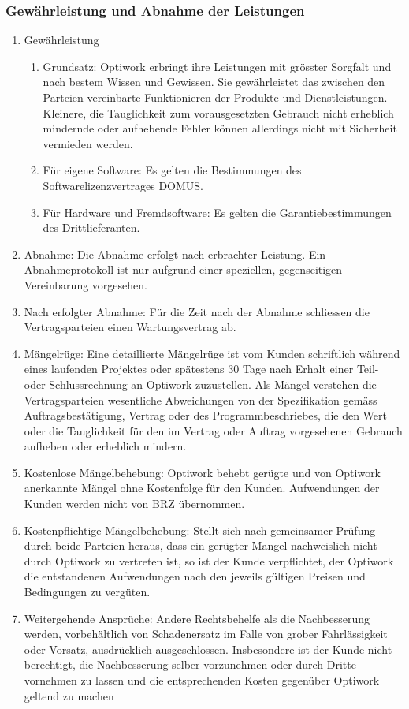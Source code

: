 \subsubsection*{Gewährleistung und Abnahme der Leistungen}
\begin{enumerate}
  \item Gewährleistung
  \begin{enumerate}
    \item Grundsatz: Optiwork erbringt ihre Leistungen mit grösster Sorgfalt und nach bestem Wissen und Gewissen. Sie gewährleistet das zwischen den Parteien vereinbarte Funktionieren der Produkte und Dienstleistungen. Kleinere, die Tauglichkeit zum vorausgesetzten Gebrauch nicht erheblich mindernde oder aufhebende Fehler können allerdings nicht mit Sicherheit vermieden werden.
  \item Für eigene Software: Es gelten die Bestimmungen des Softwarelizenzvertrages DOMUS.
  \item Für Hardware und Fremdsoftware: Es gelten die Garantiebestimmungen des Drittlieferanten.
  \end{enumerate}
  \item Abnahme: Die Abnahme erfolgt nach erbrachter Leistung. Ein Abnahmeprotokoll ist nur aufgrund einer speziellen, gegenseitigen Vereinbarung vorgesehen.
  \item Nach erfolgter Abnahme: Für die Zeit nach der Abnahme schliessen die Vertragsparteien einen Wartungsvertrag ab.
  \item Mängelrüge: Eine detaillierte Mängelrüge ist vom Kunden schriftlich während eines laufenden Projektes oder spätestens 30 Tage nach Erhalt einer Teil- oder Schlussrechnung an Optiwork zuzustellen.
  Als Mängel verstehen die Vertragsparteien wesentliche Abweichungen von der Spezifikation gemäss Auftragsbestätigung, Vertrag oder des Programmbeschriebes, die den Wert oder die Tauglichkeit für den im Vertrag oder Auftrag vorgesehenen Gebrauch aufheben oder erheblich mindern.
  \item Kostenlose Mängelbehebung: Optiwork behebt gerügte und von Optiwork anerkannte Mängel ohne Kostenfolge für den Kunden. Aufwendungen der Kunden werden nicht von BRZ übernommen.
  \item Kostenpflichtige Mängelbehebung: Stellt sich nach gemeinsamer Prüfung durch beide Parteien heraus, dass ein gerügter Mangel nachweislich nicht durch Optiwork zu vertreten ist, so ist der Kunde verpflichtet, der Optiwork die entstandenen Aufwendungen nach den jeweils gültigen Preisen und Bedingungen zu vergüten.
  \item Weitergehende Ansprüche: Andere Rechtsbehelfe als die Nachbesserung werden, vorbehältlich von Schadenersatz im Falle von grober Fahrlässigkeit oder Vorsatz, ausdrücklich ausgeschlossen. Insbesondere ist der Kunde nicht berechtigt, die Nachbesserung selber vorzunehmen oder durch Dritte vornehmen zu lassen und die entsprechenden Kosten gegenüber Optiwork geltend zu machen
\end{enumerate}

